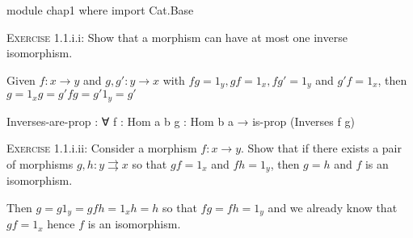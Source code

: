 \documentclass[12pt]{article}
\begin{document}
\begin{code}
module chap1 where
import Cat.Base
\end{code}

\textsc{Exercise} 1.1.i.i: Show that a morphism can have at most one inverse isomorphism.
\vspace{10pt}

Given \(f:x→y\) and \(g,g':y→x\) with \(fg=1_y,gf= 1_x,fg' = 1_y\) and \(g'f=1_x\), then \(g=1_xg=g'fg=g'1_y=g'\)

\begin{code}
Inverses-are-prop : ∀ {f : Hom a b} {g : Hom b a} → is-prop (Inverses f g)
\end{code}
\vspace{10pt}

\textsc{Exercise} 1.1.i.ii: Consider a morphism \(f: x → y\). Show  that if there exists a pair of morphisms \(g,h:y\rightrightarrows x\) so that \(gf=1_x\) and \(fh=1_y\), then \(g = h\) and \(f\) is an isomorphism.
\vspace{10pt}

Then \(g = g1_y = gfh = 1_xh = h\) so that \(fg = fh = 1_y\) and we already know that \(gf = 1_x\) hence \(f\) is an isomorphism.
\end{document}
